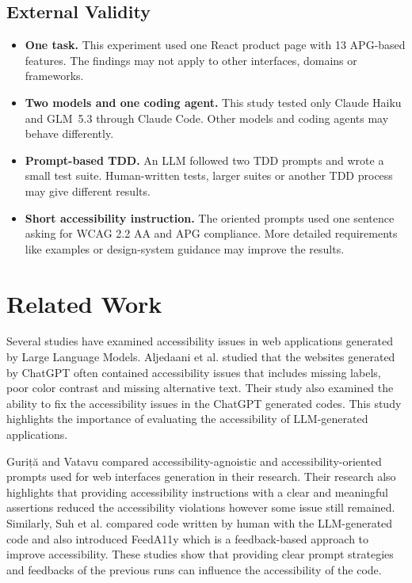 \documentclass[conference]{IEEEtran}
\begin{document}
\subsection{External Validity}

\begin{itemize}
  \item \textbf{One task.} This experiment used one React product page with 13 APG-based features. The findings may not apply to other interfaces, domains or frameworks.
  \item \textbf{Two models and one coding agent.} This study tested only Claude Haiku and GLM~5.3 through Claude Code. Other models and coding agents may behave differently.
  \item \textbf{Prompt-based TDD.} An LLM followed two TDD prompts and wrote a small test suite. Human-written tests, larger suites or another TDD process may give different results.
  \item \textbf{Short accessibility instruction.} The oriented prompts used one sentence asking for WCAG 2.2 AA and APG compliance. More detailed requirements like examples or design-system guidance may improve the results.
\end{itemize}

\section{Related Work}

Several studies have examined accessibility issues in web applications generated by Large Language Models. Aljedaani et al. \cite{aljedaani2024} studied that the websites generated by ChatGPT often contained accessibility issues that includes missing labels, poor color contrast and missing alternative text. Their study also examined the ability to fix the accessibility issues in the ChatGPT generated codes. This study highlights the importance of evaluating the accessibility of LLM-generated applications.

Guriță and Vatavu \cite{gurita2025} compared accessibility-agnoistic and accessibility-oriented prompts used for web interfaces generation in their research. Their research also highlights that providing accessibility instructions with a clear and meaningful assertions reduced the accessibility violations however some issue still remained. Similarly, Suh et al. \cite{suh2025} compared code written by human with the LLM-generated code and also introduced FeedA11y which is a feedback-based approach to improve accessibility. These studies show that providing clear prompt strategies and feedbacks of the previous runs can influence the accessibility of the code.
\end{document}
